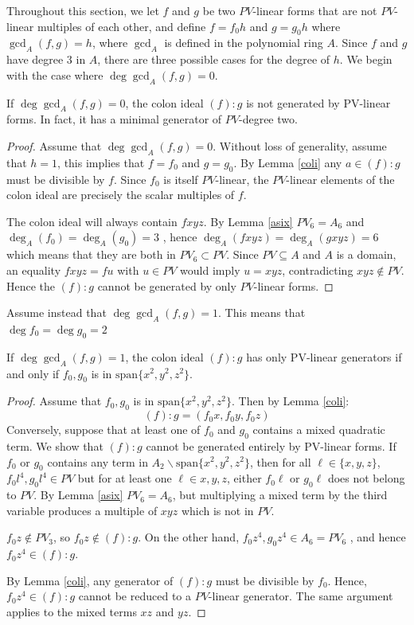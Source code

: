 \noindent
Throughout this section, we let $f$ and $g$ be two $PV$-linear forms that are not $PV$-linear multiples of each other, and define $f=f_0h$ and $g=g_0h$ where $\gcd_A (f,g)=h$, where $\gcd_A$ is defined in the polynomial ring $A$. Since $f$ and $g$ have degree $3$ in $A$, there are three possible cases for the degree of $h$. 
We begin with the case where $\deg\gcd_A(f,g)=0$.
\begin{lem}\label{deg0}
    If $\deg\gcd_A(f,g)=0$, the colon ideal $(f):g$ is not generated by PV-linear forms. In fact, it has a minimal generator of $PV$-degree two.
\end{lem}
\begin{proof}
    

Assume that $\deg\gcd_A(f,g)=0$. Without loss of generality, assume that $h=1$, this implies that $f=f_0$ and $g=g_0$. By Lemma \ref{coli} any $a\in (f):g$ must be divisible by $f$. Since $f_0$ is itself $PV$-linear, the $PV$-linear elements of the colon ideal are precisely the scalar multiples of $f$. 

The colon ideal will always contain $fxyz$. By Lemma \ref{asix} $PV_6=A_6$ and $\deg_A(f_0)=\deg_A(g_0)=3$ , hence $\deg_A(fxyz)=\deg_A(gxyz)=6$ which means that they are both in  $PV_6\subset PV$. 
Since $PV \subseteq A$ and $A$ is a domain, an equality $fxyz=fu$ with $u\in PV$ would imply $u=xyz$, contradicting $xyz\notin PV$. Hence the $(f):g$ cannot be generated by only $PV$-linear forms.
\end{proof}
\noindent
Assume instead that $\deg\gcd_A(f,g)=1$. This means that $\deg f_0 =\deg g_0 =2$

\begin{lem}\label{deg1}
If $\deg\gcd_A(f,g)=1$, the colon ideal $(f):g$ has only PV-linear generators if and only if $f_0,g_0$ is in $\text{span}\{x^2,y^2,z^2\}$.   
\end{lem}
\begin{proof}
Assume that $f_0,g_0$ is in $\text{span}\{x^2,y^2,z^2\}$. Then by  Lemma \ref{coli}:
$$(f):g=(f_0x,f_0y,f_0z)$$
\noindent
Conversely, suppose that at least one of $f_0$ and $g_0$
contains a mixed quadratic term. We show that $(f):g$ cannot be generated entirely by PV-linear forms.
If $f_0$ or $g_0$ contains any term in $A_2\backslash \text{span}\{x^2,y^2,z^2\}$, then for all $\ell\in \{x,y,z\}$, $f_0l^4,g_0l^4\in PV$ but for at least one $\ell\in{x,y,z}$, either $f_0\ell$ or $g_0\ell$ does not belong to $PV$. By Lemma \ref{asix} $PV_6=A_6$, but multiplying a mixed term by the third variable produces a multiple of $xyz$ which is not in $PV$.

$f_0z\notin PV_3$,  so $f_0z\notin(f):g$. On the other hand, $f_0z^4,g_0z^4\in A_6=PV_6$ , and hence $f_0z^4\in(f):g$. 

By Lemma \ref{coli}, any generator of $(f):g$ must be divisible by $f_0$. Hence, $f_0z^4\in(f):g$ cannot be  reduced to a $PV$-linear generator. The same argument applies to the mixed terms $xz$ and $yz$.
\end{proof}
\noindent


